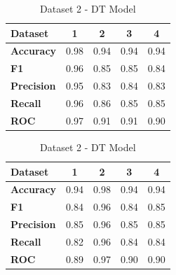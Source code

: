 \begin{table}[H]
  \centering
  \caption{DT model cross-performance results}\label{tab:dt_model_cross-performance_results}
  \begin{subtable}[H]{0.45\textwidth}
    \centering
    \begin{tabular}{|l|c|c|c|c|}
      \hline
      \textbf{Dataset}   & \textbf{1} & \textbf{2} & \textbf{3} & \textbf{4} \\
      \hline
      \textbf{Accuracy}  & 0.98       & 0.94       & 0.94       & 0.94       \\
      \textbf{F1}        & 0.96       & 0.85       & 0.85       & 0.84       \\
      \textbf{Precision} & 0.95       & 0.83       & 0.84       & 0.83       \\
      \textbf{Recall}    & 0.96       & 0.86       & 0.85       & 0.85       \\
      \textbf{ROC}       & 0.97       & 0.91       & 0.91       & 0.90       \\
      \hline
    \end{tabular}
    \caption{Dataset 1 - DT Model}\label{subtab:dataset_1_dt_model}
  \end{subtable}
  \quad
  \begin{subtable}[H]{0.45\textwidth}
    \centering
    \begin{tabular}{|l|c|c|c|c|}
      \hline
      \textbf{Dataset}   & \textbf{1} & \textbf{2} & \textbf{3} & \textbf{4} \\
      \hline
      \textbf{Accuracy}  & 0.94       & 0.98       & 0.94       & 0.94       \\
      \textbf{F1}        & 0.84       & 0.96       & 0.84       & 0.85       \\
      \textbf{Precision} & 0.85       & 0.96       & 0.85       & 0.85       \\
      \textbf{Recall}    & 0.82       & 0.96       & 0.84       & 0.84       \\
      \textbf{ROC}       & 0.89       & 0.97       & 0.90       & 0.90       \\
      \hline
    \end{tabular}
    \caption{Dataset 2 - DT Model}\label{subtab:dataset_2_dt_model}
  \end{subtable}
  \quad
  \begin{subtable}[H]{0.45\textwidth}

\end{subtable}
\end{table}

